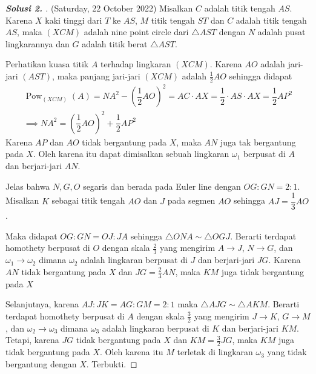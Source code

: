 \begin{proof}[\textbf{Solusi 2. }] (Saturday, 22 October 2022) Misalkan $C$ adalah titik tengah $AS$. Karena $X$ kaki tinggi dari $T$ ke $AS$, $M$ titik tengah $ST$ dan $C$ adalah titik tengah $AS$, maka $(XCM)$ adalah nine point circle dari $\triangle AST$ dengan $N$ adalah pusat lingkarannya dan $G$ adalah titik berat $\triangle AST$.

% 


Perhatikan kuasa titik $A$ terhadap lingkaran $(XCM)$. Karena $AO$ adalah jari-jari $(AST)$, maka panjang jari-jari $(XCM)$ adalah $\frac{1}{2}AO$ sehingga didapat
\begin{align*}
    \operatorname{Pow}_{(XCM)} (A) = NA^2 - \left(\dfrac{1}{2}AO\right)^2 = AC \cdot AX = \dfrac{1}{2} \cdot AS \cdot AX = \dfrac{1}{2} AP^2\\
    \implies NA^2 = \left(\dfrac{1}{2}AO\right)^2 + \dfrac{1}{2} AP^2
\end{align*}
Karena $AP$ dan $AO$ tidak bergantung pada $X$, maka $AN$ juga tak bergantung pada $X$. Oleh karena itu dapat dimisalkan sebuah lingkaran $\omega_1$ berpusat di $A$ dan berjari-jari $AN$.

Jelas bahwa $N,G,O$ segaris dan berada pada Euler line dengan $OG:GN=2:1$. Misalkan $K$ sebagai titik tengah $AO$ dan $J$ pada segmen $AO$ sehingga $AJ = \dfrac{1}{3}AO$. 

Maka didapat $OG:GN=OJ:JA$ sehingga $\triangle ONA \sim \triangle OGJ$. Berarti terdapat homothety berpusat di $O$ dengan skala $\frac{2}{3}$ yang mengirim $A \to J$, $N \to G$, dan $\omega_1 \to \omega_2$ dimana $\omega_2$ adalah lingkaran berpusat di $J$ dan berjari-jari $JG$. Karena $AN$ tidak bergantung pada $X$ dan $JG = \frac{2}{3} AN$, maka $KM$ juga tidak bergantung pada $X$

Selanjutnya, karena $AJ:JK=AG:GM=2:1$ maka $\triangle AJG \sim \triangle AKM$. Berarti terdapat homothety berpusat di $A$ dengan skala $\frac{3}{2}$ yang mengirim $J \to K$, $G \to M$, dan $\omega_2 \to \omega_3$ dimana $\omega_3$ adalah lingkaran berpusat di $K$ dan berjari-jari $KM$. Tetapi, karena $JG$ tidak bergantung pada $X$ dan $KM = \frac{3}{2} JG$, maka $KM$ juga tidak bergantung pada $X$. Oleh karena itu $M$ terletak di lingkaran $\omega_3$ yang tidak bergantung dengan $X$. Terbukti.
\end{proof}